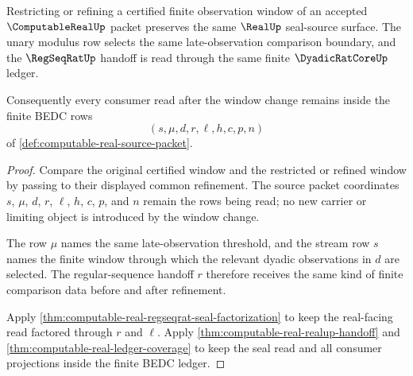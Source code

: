 \begin{theorem}
\label{thm:computable-real-real-seal-refinement-coverage}
Restricting or refining a certified finite observation window of an accepted
$\ComputableRealUp$ packet preserves the same $\RealUp$ seal-source surface.
The unary modulus row selects the same late-observation comparison boundary,
and the $\RegSeqRatUp$ handoff is read through the same finite
$\DyadicRatCoreUp$ ledger.

Consequently every consumer read after the window change remains inside the
finite BEDC rows
$$
(s,\mu,d,r,\ell,h,c,p,n)
$$
of \autoref{def:computable-real-source-packet}.
\end{theorem}
\begin{proof}
Compare the original certified window and the restricted or refined window by
passing to their displayed common refinement. The source packet coordinates
$s$, $\mu$, $d$, $r$, $\ell$, $h$, $c$, $p$, and $n$ remain the rows being
read; no new carrier or limiting object is introduced by the window change.

The row $\mu$ names the same late-observation threshold, and the stream row
$s$ names the finite window through which the relevant dyadic observations in
$d$ are selected. The regular-sequence handoff $r$ therefore receives the
same kind of finite comparison data before and after refinement.

Apply
\autoref{thm:computable-real-regseqrat-seal-factorization} to keep the
real-facing read factored through $r$ and $\ell$. Apply
\autoref{thm:computable-real-realup-handoff} and
\autoref{thm:computable-real-ledger-coverage} to keep the seal read and all
consumer projections inside the finite BEDC ledger.
\end{proof}

